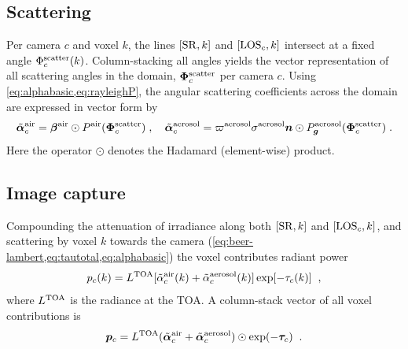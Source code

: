 \documentclass[10pt,letterpaper]{article}
\newcommand{\vect}[1]{\bm{#1}}
\begin{document}
\subsection{Scattering}
\label{sec:scattering}

Per camera $c$ and voxel $k$, the lines $[{\rm SR},k]$ and $[{\rm
  LOS}_c,k]$ intersect at a fixed angle $\Phi^{\rm scatter}_c(k)$.
Column-stacking all angles yields the vector representation of all
scattering angles in the domain, $\vect{\Phi}^{\rm scatter}_c$ per
camera $c$.
Using \cref{eq:alphabasic,eq:rayleighP}, the angular scattering
coefficients across the domain are expressed in vector form by
\begin{equation}
  \tilde{\vect{\alpha}}^{\rm air}_c =
  \vect{\beta}^{\rm air} \odot P^{\rm air}(\vect{\Phi}^{\rm scatter}_c)\;,
  \quad
  \tilde{\vect{\alpha}}^{\rm aerosol}_c =
  \varpi^{\rm aerosol} \sigma^{\rm aerosol}
  {\bm n} \odot P^{\rm aerosol}_{\bm g}(\vect{\Phi}^{\rm scatter}_c) \;.
  \label{eq:alpha_matrix}
\end{equation}
Here the operator $\odot$ denotes the Hadamard (element-wise) product.


\subsection{Image capture}
\label{sec:captured-image}

Compounding the attenuation of irradiance along both $[{\rm SR},k]$
and $[{\rm LOS}_c,k]$, and scattering by voxel $k$ towards the camera
(\cref{eq:beer-lambert,eq:tautotal,eq:alphabasic}) the voxel contributes radiant power
\begin{equation}
  p_c(k)= L^{\rm TOA}
  [\tilde{\alpha}^{\rm air}_c(k) + \tilde{\alpha}^{\rm aerosol}_c(k)]
  \exp[-\tau_c(k)]
  \;\;,
  \label{eq:ick}
\end{equation}
where $L^{\rm TOA}$ is the radiance at the TOA. A column-stack vector
of all voxel contributions is
\begin{equation}
  {\bm p}_c= L^{\rm TOA}
  (\tilde{\vect{\alpha}}^{\rm air}_c + \tilde{\vect{\alpha}}^{\rm aerosol}_c)
  \odot \exp(-\vect{\tau}_c)
  \;\;.
  \label{eq:pc}
\end{equation}
\end{document}
